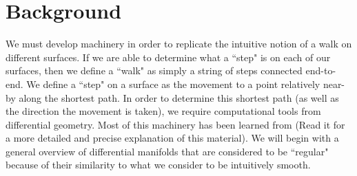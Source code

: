 \documentclass{article}
\begin{document}
\section{Background}
	We must develop machinery in order to replicate the intuitive notion of a walk on different surfaces.
	If we are able to determine what a ``step" is on each of our surfaces, then we define a ``walk" as simply a string of steps connected end-to-end.
	We define a ``step" on a surface as the movement to a point relatively near-by along the shortest path.
	In order to determine this shortest path (as well as the direction the movement is taken), we require computational tools from differential geometry.
	Most of this machinery has been learned from \cite{BanchoffLovett_DiffGeo_2010} (Read it for a more detailed and precise explanation of this material).
	We will begin with a general overview of differential manifolds that are considered to be ``regular" because of their similarity to what we consider to be intuitively smooth.
	
\end{document}
